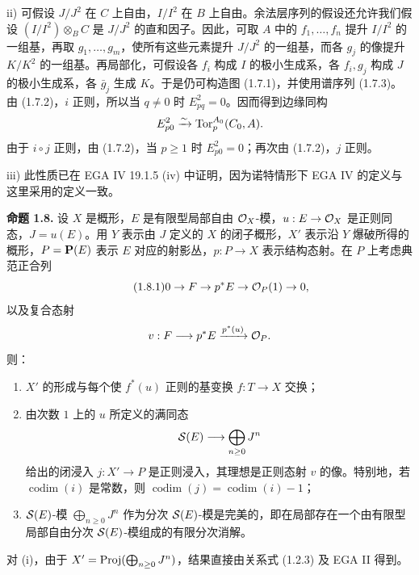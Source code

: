 ii) 可假设 \(J/J^2\) 在 \(C\) 上自由，\(I/I^2\) 在 \(B\) 上自由。余法层序列的假设还允许我们假设 \((I/I^2)\otimes_B C\) 是 \(J/J^2\) 的直和因子。因此，可取 \(A\) 中的 \(f_1,\ldots,f_n\) 提升 \(I/I^2\) 的一组基，再取 \(g_1,\ldots,g_m\)，使所有这些元素提升 \(J/J^2\) 的一组基，而各 \(g_j\) 的像提升 \(K/K^2\) 的一组基。再局部化，可假设各 \(f_i\) 构成 \(I\) 的极小生成系，各 \(f_i,g_j\) 构成 \(J\) 的极小生成系，各 \(\bar g_j\) 生成 \(K\)。于是仍可构造图 (1.7.1)，并使用谱序列 (1.7.3)。由 (1.7.2)，\(i\) 正则，所以当 \(q\ne0\) 时 \(E^2_{pq}=0\)。因而得到边缘同构
\[
 E^2_{p0}\xrightarrow{\sim}\operatorname{Tor}_p^{A_0}(C_0,A).
\]
由于 \(i\circ j\) 正则，由 (1.7.2)，当 \(p\geq1\) 时 \(E^2_{p0}=0\)；再次由 (1.7.2)，\(j\) 正则。

iii) 此性质已在 EGA IV 19.1.5 (iv) 中证明，因为诺特情形下 EGA IV 的定义与这里采用的定义一致。

\textbf{命题 1.8.} 设 \(X\) 是概形，\(E\) 是有限型局部自由 \(\mathcal O_X\)-模，\(u:E\to\mathcal O_X\) 是正则同态，\(J=u(E)\)。用 \(Y\) 表示由 \(J\) 定义的 \(X\) 的闭子概形，\(X'\) 表示沿 \(Y\) 爆破所得的概形，\(P=\mathbf P(E)\) 表示 \(E\) 对应的射影丛，\(p:P\to X\) 表示结构态射。在 \(P\) 上考虑典范正合列
\begin{equation}\tag{1.8.1}
0\to F\to p^*E\to\mathcal O_P(1)\to0,
\end{equation}
以及复合态射
\[
  v:F\longrightarrow p^*E\xrightarrow{p^*(u)}\mathcal O_P .
\]
则：
\begin{enumerate}
\item \(X'\) 的形成与每个使 \(f^*(u)\) 正则的基变换 \(f:T\to X\) 交换；
\item 由次数 \(1\) 上的 \(u\) 所定义的满同态
\[
  \mathcal S(E)\longrightarrow\bigoplus_{n\ge0}J^n
\]
给出的闭浸入 \(j:X'\to P\) 是正则浸入，其理想是正则态射 \(v\) 的像。特别地，若 \(\operatorname{codim}(i)\) 是常数，则 \(\operatorname{codim}(j)=\operatorname{codim}(i)-1\)；
\item \(\mathcal S(E)\)-模 \(\bigoplus_{n\ge0}J^n\) 作为分次 \(\mathcal S(E)\)-模是完美的，即在局部存在一个由有限型局部自由分次 \(\mathcal S(E)\)-模组成的有限分次消解。
\end{enumerate}

对 (i)，由于 \(X'=\operatorname{Proj}(\bigoplus_{n\ge0}J^n)\)，结果直接由关系式 (1.2.3) 及 EGA II 得到。

